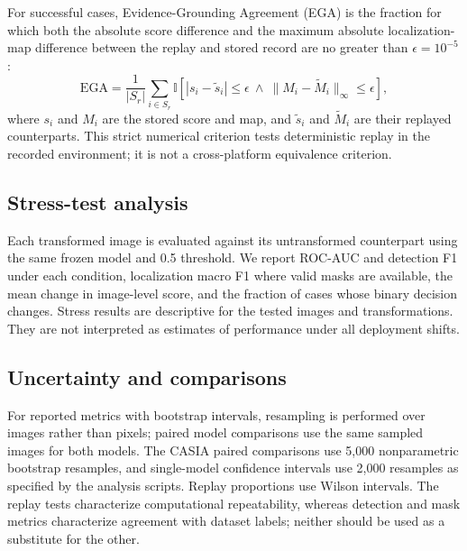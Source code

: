 For successful cases, Evidence-Grounding Agreement (EGA) is the fraction for which both the absolute score difference and the maximum absolute localization-map difference between the replay and stored record are no greater than $\epsilon=10^{-5}$:
\begin{equation}
\mathrm{EGA}=\frac{1}{|S_r|}\sum_{i\in S_r}\mathbb{I}\left[|s_i-\tilde{s}_i|\leq\epsilon\ \land\ \|M_i-\tilde{M}_i\|_{\infty}\leq\epsilon\right],
\end{equation}
where $s_i$ and $M_i$ are the stored score and map, and $\tilde{s}_i$ and $\tilde{M}_i$ are their replayed counterparts. This strict numerical criterion tests deterministic replay in the recorded environment; it is not a cross-platform equivalence criterion.

\subsection{Stress-test analysis}
Each transformed image is evaluated against its untransformed counterpart using the same frozen model and 0.5 threshold. We report ROC-AUC and detection F1 under each condition, localization macro F1 where valid masks are available, the mean change in image-level score, and the fraction of cases whose binary decision changes. Stress results are descriptive for the tested images and transformations. They are not interpreted as estimates of performance under all deployment shifts.

\subsection{Uncertainty and comparisons}
For reported metrics with bootstrap intervals, resampling is performed over images rather than pixels; paired model comparisons use the same sampled images for both models. The CASIA paired comparisons use 5,000 nonparametric bootstrap resamples, and single-model confidence intervals use 2,000 resamples as specified by the analysis scripts. Replay proportions use Wilson intervals. The replay tests characterize computational repeatability, whereas detection and mask metrics characterize agreement with dataset labels; neither should be used as a substitute for the other.
